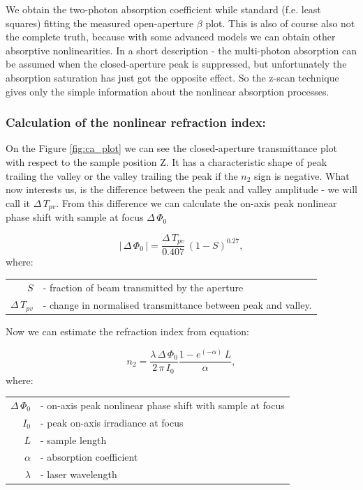 \documentclass[12pt,twoside,a4paper]{article}
\numberwithin{equation}{subsection}
\numberwithin{figure}{subsection}
\begin{document}
We obtain the two-photon absorption coefficient while standard (f.e. least squares) fitting the measured open-aperture $\beta $ 
plot. This is also of course also not the complete truth, because with some advanced models we can obtain other absorptive
nonlinearities. In a short description - the multi-photon absorption can be assumed when the closed-aperture peak is suppressed,
but unfortunately the absorption saturation has just got the opposite effect. So the z-scan technique gives only the simple
information about the nonlinear absorption processes.

\subsubsection*{Calculation of the nonlinear refraction index:}

On the Figure \ref{fig:ca_plot} we can see the closed-aperture transmittance plot with respect to the sample position Z. It has a
characteristic shape of peak trailing the valley or the valley trailing the peak if the ${n_{2}}$ sign is negative. What now
interests us, is the difference between the peak and valley amplitude - we will call it $\Delta \,{T_{pv}}$. From this difference
we can calculate the on-axis peak nonlinear phase shift with sample at focus $\Delta \,{\Phi_{0}}$

\begin{equation} \label{eq:nlo_onaxisshift}
  \left| \! \,\Delta \,{\Phi_{0}}\, \!  \right| =\frac {\Delta \,{T_{pv}}}{0.407}\,(1 - S)^{0.27},
\end{equation}
where: 
\begin{tabular}{ r l}
  $S$ & - fraction of beam transmitted by the aperture \\
  $\Delta \,{T_{pv}}$ & - change in normalised transmittance between peak and valley. \\ 
\end{tabular}

Now we can estimate the refraction index from equation:

\begin{equation} \label{eq:nlo_estrefindex}
  {n_{2}}=\frac {\lambda \,\Delta \,{\Phi_{0}}}{2\,\pi \,{I_{0}}\,}\frac {1 - e^{( - \alpha )}\,L}{\alpha },
\end{equation}
where: 
\begin{tabular}{ r l}
  $\Delta \,{\Phi_{0}}$ & - on-axis peak nonlinear phase shift with sample at focus \\
  ${I_{0}}$  & - peak on-axis irradiance at focus \\
  $L$ & - sample length \\
  $\alpha $ & - absorption coefficient \\
  $\lambda $  & - laser wavelength \\
\end{tabular}
\end{document}
